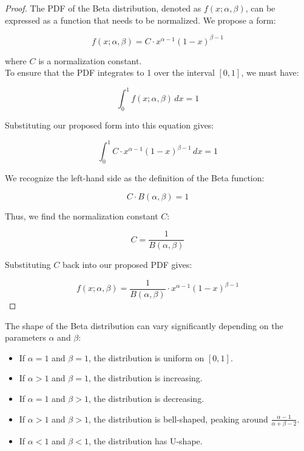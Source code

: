 \begin{proof}
    The PDF of the Beta distribution, denoted as \(f(x; \alpha, \beta)\), can be expressed as a function that needs to be normalized. We propose a form:

\[
f(x; \alpha, \beta) = C \cdot x^{\alpha - 1} (1 - x)^{\beta - 1}
\]

where \(C\) is a normalization constant.\\

To ensure that the PDF integrates to 1 over the interval \([0, 1]\), we must have:

\[
\int_0^1 f(x; \alpha, \beta) \, dx = 1
\]

Substituting our proposed form into this equation gives:

\[
\int_0^1 C \cdot x^{\alpha - 1} (1 - x)^{\beta - 1} \, dx = 1
\]

We recognize the left-hand side as the definition of the Beta function:

\[
C \cdot B(\alpha, \beta) = 1
\]

Thus, we find the normalization constant \(C\):

\[
C = \frac{1}{B(\alpha, \beta)}
\]

Substituting \(C\) back into our proposed PDF gives:

\[
f(x; \alpha, \beta) = \frac{1}{B(\alpha, \beta)} \cdot x^{\alpha - 1} (1 - x)^{\beta - 1}
\]
\end{proof}

The shape of the Beta distribution can vary significantly depending on the parameters \(\alpha\) and \(\beta\):

\begin{itemize}
    \item If \(\alpha = 1\) and \(\beta = 1\), the distribution is uniform on \([0, 1]\).
    \item If \(\alpha > 1\) and \(\beta = 1\), the distribution is increasing.
    \item If \(\alpha = 1\) and \(\beta > 1\), the distribution is decreasing.
    \item If \(\alpha > 1\) and \(\beta > 1\), the distribution is bell-shaped, peaking around \(\frac{\alpha - 1}{\alpha + \beta - 2}\).
    \item If \(\alpha < 1\) and \(\beta < 1\), the distribution has U-shape.
\end{itemize}

